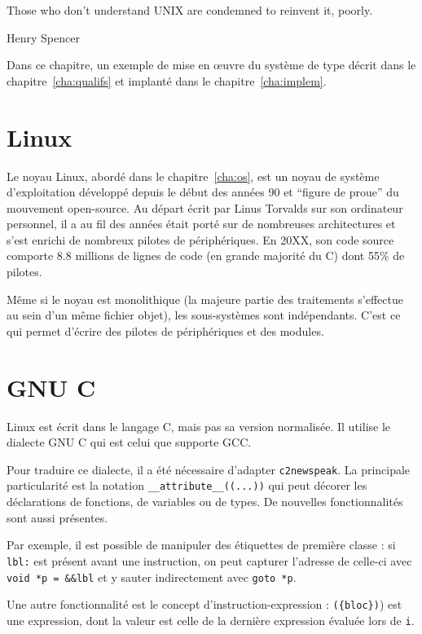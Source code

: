 \epigraph
  { Those who don't understand UNIX are condemned to reinvent it, poorly.}
  { Henry Spencer }

Dans ce chapitre, un exemple de mise en œuvre du système de type décrit dans le
chapitre~\ref{cha:qualifs} et implanté dans le chapitre~\ref{cha:implem}.

\section{Linux}

Le noyau Linux, abordé dans le chapitre~\ref{cha:os}, est un noyau de système
d'exploitation développé depuis le début des années 90 et ``figure de proue'' du
mouvement open-source. Au départ écrit par Linus Torvalds sur son ordinateur
personnel, il a au fil des années était porté sur de nombreuses architectures et
s'est enrichi de nombreux pilotes de périphériques. En 20XX, son code source
comporte 8.8 millions de lignes de code (en grande majorité du C) dont 55\% de
pilotes.


Même si le noyau est monolithique (la majeure partie des traitements s'effectue
au sein d'un même fichier objet), les sous-systèmes sont indépendants. C'est ce
qui permet d'écrire des pilotes de périphériques et des modules.

\section{GNU C}

Linux est écrit dans le langage C, mais pas sa version normalisée. Il utilise le
dialecte GNU C qui est celui que supporte GCC.

Pour traduire ce dialecte, il a été nécessaire d'adapter \texttt{c2newspeak}. La
principale particularité est la notation \texttt{\_\_attribute\_\_((...))} qui
peut décorer les déclarations de fonctions, de variables ou de types. De
nouvelles fonctionnalités sont aussi présentes.

Par exemple, il est possible de manipuler des étiquettes de première classe : si
\texttt{lbl:} est présent avant une instruction, on peut capturer l'adresse de
celle-ci avec \texttt{void *p = \&\&lbl} et y sauter indirectement avec
\texttt{goto *p}.

Une autre fonctionnalité est le concept d'instruction-expression :
\texttt{(\{bloc\})}) est une expression, dont la valeur est celle de la dernière
expression évaluée lors de \texttt{i}.

